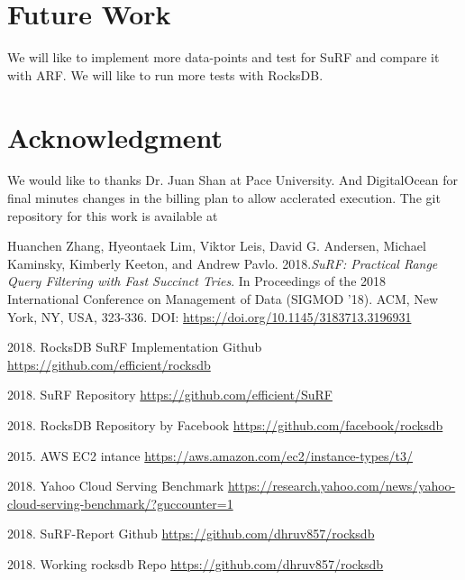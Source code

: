 \documentclass[12pt,conference]{IEEEtran}
\begin{document}
\section{Future Work}
We will like to implement more data-points and test for SuRF and compare it with ARF. We will like to run more tests with RocksDB. 

\section*{Acknowledgment}

We would like to thanks Dr. Juan Shan at Pace University. And DigitalOcean for final minutes changes in the billing plan to allow acclerated execution. The git repository for this work is available at \cite{7}

\begin{thebibliography}{r1}

Huanchen Zhang, Hyeontaek Lim, Viktor Leis, David G. Andersen, Michael Kaminsky, Kimberly Keeton, and Andrew Pavlo. 2018.\emph{SuRF: Practical Range Query Filtering with Fast Succinct Tries}. In Proceedings of the 2018 International Conference on Management of Data (SIGMOD '18). ACM, New York, NY, USA, 323-336. DOI: \url{https://doi.org/10.1145/3183713.3196931}

 2018. RocksDB SuRF Implementation Github \url{https://github.com/efficient/rocksdb}  

 2018. SuRF Repository \url{https://github.com/efficient/SuRF}

2018.  RocksDB Repository by Facebook \url{https://github.com/facebook/rocksdb} 

2015. AWS EC2 intance \url{https://aws.amazon.com/ec2/instance-types/t3/} 

2018. Yahoo Cloud Serving Benchmark \url{https://research.yahoo.com/news/yahoo-cloud-serving-benchmark/?guccounter=1}

2018. SuRF-Report Github \url{https://github.com/dhruv857/rocksdb}

2018. Working rocksdb Repo \url{https://github.com/dhruv857/rocksdb}

\end{thebibliography}
\end{document}

